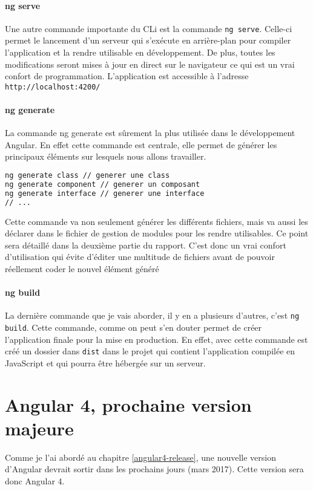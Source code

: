\paragraph{ng serve}
Une autre commande importante du CLi est la commande \texttt{ng serve}. Celle-ci permet le lancement d'un serveur qui s'exécute en arrière-plan pour compiler l'application et la rendre utilisable en développement. De plus, toutes les modifications seront mises à jour en direct sur le navigateur ce qui est un vrai confort de programmation. L'application est accessible à l'adresse \texttt{http://localhost:4200/}

\paragraph{ng generate}
La commande ng generate est sûrement la plus utilisée dans le développement Angular. En effet cette commande est centrale, elle permet de générer les principaux éléments sur lesquels nous allons travailler.
\begin{lstlisting}[language=bash]
ng generate class // generer une class
ng generate component // generer un composant
ng generate interface // generer une interface
// ...
\end{lstlisting}
Cette commande va non seulement générer les différents fichiers, mais va aussi les déclarer dans le fichier de gestion de modules pour les rendre utilisables. Ce point sera détaillé dans la deuxième partie du rapport. C'est donc un vrai confort d'utilisation qui évite d'éditer une multitude de fichiers avant de pouvoir réellement coder le nouvel élément généré
\paragraph{ng build}
La dernière commande que je vais aborder, il y en a plusieurs d'autres\cite{angluarcli:doc}, c'est \texttt{ng build}. Cette commande, comme on peut s'en douter permet de créer l'application finale pour la mise en production. En effet, avec cette commande est créé un dossier dans \texttt{dist} dans le projet qui contient l'application compilée en JavaScript et qui pourra être hébergée sur un serveur.

\section{Angular 4, prochaine version majeure}
Comme je l'ai abordé au chapitre \ref{angular4-release}, une nouvelle version d'Angular devrait sortir dans les prochains jours (mars 2017). Cette version sera donc Angular 4. 
